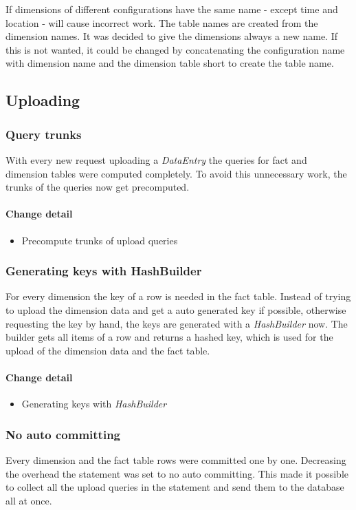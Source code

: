 If dimensions of different configurations have the same name - except time and location -
will cause incorrect work. The table names are created from the dimension names.
It was decided to give the dimensions always a new name. If this is
not wanted, it could be changed by concatenating
the configuration name with dimension name and the dimension table short
to create the table name.

\subsection{Uploading}
\subsubsection{Query trunks}
With every new request uploading a \textit{DataEntry} the queries 
for fact and dimension tables were computed completely. To avoid
this unnecessary work, the trunks of the queries now get precomputed.


\paragraph{Change detail}
\begin{itemize}
  \item Precompute trunks of upload queries
\end{itemize}


\subsubsection{Generating keys with HashBuilder}
For every dimension the key of a row is needed in the fact table.
Instead of trying to upload the dimension data and get a auto generated key if possible,
otherwise requesting the key by hand, the keys are generated with a
\textit{HashBuilder} now. The builder gets all items of a row and
returns a hashed key, which is used for the upload of the dimension data
and the fact table.

\paragraph{Change detail}
\begin{itemize}
  \item Generating keys with \textit{HashBuilder}
\end{itemize}


\subsubsection{No auto committing}\label{noAu}
Every dimension and the fact table rows were committed one by one. Decreasing
the overhead the statement was set to no auto committing. This made it possible
to collect all the upload queries in the statement and send them to the database
all at once.

